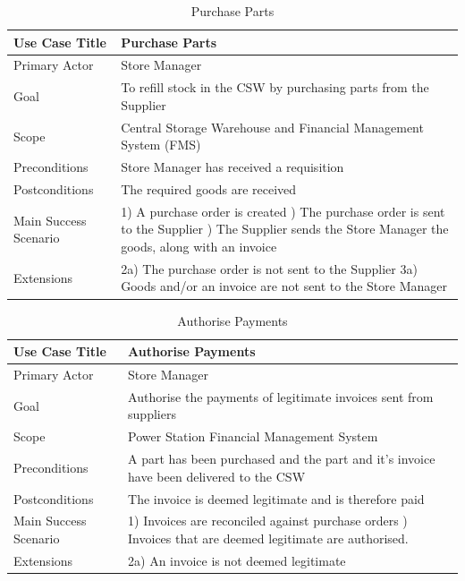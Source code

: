 \begin{table}[]
	\centering
	\caption{Purchase Parts}
	\label{Purchase-Parts}
	\begin{tabularx}{\textwidth}{| l | X |}
		\hline
		Use Case Title	&  Purchase Parts\\ \hline \hline
		Primary Actor	&  Store Manager \\ \hline
		Goal	&  To refill stock in the CSW by purchasing parts from the Supplier\\ \hline
		Scope	&  Central Storage Warehouse and Financial Management System (FMS)\\ \hline
		Preconditions	&  Store Manager has received a requisition\\ \hline
		Postconditions	&  The required goods are received \\ \hline
		Main Success Scenario	& 
		1) A purchase order is created \newline
		2) The purchase order is sent to the Supplier \newline
		3) The Supplier sends the Store Manager the goods, along with an invoice 
		\\ \hline
		Extensions	& 
		2a) The purchase order is not sent to the Supplier \newline
		3a) Goods and/or an invoice are not sent to the Store Manager  
		\\ \hline
	\end{tabularx}
\end{table}

\begin{table}[]
	\centering
	\caption{Authorise Payments}
	\label{Authorise Payments}
	\begin{tabularx}{\textwidth}{| l | X |}
		\hline
		Use Case Title	&  Authorise Payments \\ \hline \hline
		Primary Actor	&  Store Manager \\ \hline
		Goal	&  Authorise the payments of legitimate invoices sent from suppliers\\ \hline
		Scope	&  Power Station Financial Management System \\ \hline
		Preconditions	&  A part has been purchased and the part and it's invoice have been delivered to the CSW\\ \hline
		Postconditions	&  The invoice is deemed legitimate and is therefore paid \\ \hline
		Main Success Scenario	&  
		1) Invoices are reconciled against purchase orders \newline
		2) Invoices that are deemed legitimate are authorised. 
		\\ \hline
		Extensions	&  
		2a) An invoice is not deemed legitimate \newline
		\\ \hline
	\end{tabularx}
\end{table}

